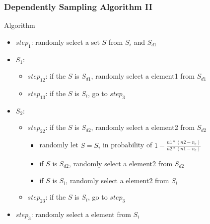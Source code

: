 \documentclass[notheorems, aspectratio=54]{beamer}
\begin{document}
\begin{frame}
    \frametitle{Dependently Sampling Algorithm II}
    \begin{block}{Algorithm}
        \begin{itemize}
            \item $step_{1}$: randomly select a set $S$ from $S_i$ and $S_{d1}$
            \item $S_1$:
            \begin{itemize}
                \item $step_{12}$: if the $S$ is $S_{d1}$, randomly select a element1 from $S_{d1}$
                \item $step_{13}$: if the $S$ is $S_i$, go to $step_{3}$
            \end{itemize}
            \item $S_2$:
            \begin{itemize}
                \item $step_{22}$: if the $S$ is $S_{d2}$, randomly select a element2 from $S_{d2}$
                \begin{itemize}
                    \item randomly let $S = S_{i}$ in probability of $1-\frac{n1*(n2-n_c)}{n2*(n1-n_c)}$
                    \item if $S$ is $S_{d2}$, randomly select a element2 from $S_{d2}$
                    \item if $S$ is $S_i$, randomly select a element2 from $S_{i}$
                \end{itemize}
                \item $step_{23}$: if the $S$ is $S_i$, go to $step_3$
            \end{itemize}
            \item $step_{3}$: randomly select a element from $S_i$
        \end{itemize}
    \end{block}
\end{frame}
\end{document}
